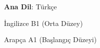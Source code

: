 \textbf{Ana Dil}: Türkçe

\begin{cvskills}
  \cvskill
    {İngilizce}
    {B1 (Orta Düzey)}

  \cvskill
    {Arapça}
    {A1 (Başlangıç Düzeyi)}

\end{cvskills}
